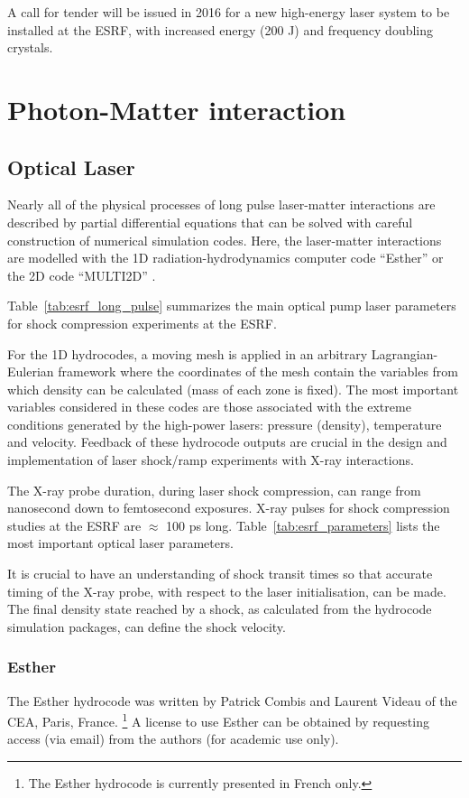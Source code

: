 \documentclass[12pt]{scrartcl}
\begin{document}
A call for tender will be issued in 2016 for a new high-energy laser system to be installed at the ESRF, with increased energy (200 J) and
frequency doubling crystals.

\section{Photon-Matter interaction}
\subsection{Optical Laser}
Nearly all of the physical processes of long pulse laser-matter interactions are described by partial differential
equations that can be solved with careful construction of numerical simulation codes. Here, the laser-matter
interactions are modelled with the 1D radiation-hydrodynamics computer code ``Esther'' \cite{Colombier2005}
or the 2D code ``MULTI2D'' \cite{Ramis2009}.

Table~\ref{tab:esrf_long_pulse} summarizes the main optical pump laser
parameters for shock compression experiments at the ESRF.

For the 1D hydrocodes, a moving mesh is applied in an arbitrary Lagrangian-Eulerian framework where the coordinates of
the mesh contain the variables from which density can be calculated (mass of
each zone is fixed). The most important variables
considered in these codes are those associated with the extreme conditions generated by the high-power lasers: pressure (density),
temperature and velocity. Feedback of these hydrocode outputs are crucial in the design and implementation of laser shock/ramp
experiments with X-ray interactions.

The X-ray probe duration, during laser shock compression, can range from nanosecond down to femtosecond exposures.
X-ray pulses for shock compression studies at the ESRF are $\approx$ 100 ps
long. Table~\ref{tab:esrf_parameters} lists the most important optical laser
parameters.

It is crucial to have an understanding of shock transit times so that accurate timing of the X-ray probe,
with respect to the laser initialisation, can be made. The final density state reached by a shock, as calculated
from the hydrocode simulation packages, can define the shock velocity.
\subsubsection{Esther}
The Esther hydrocode was written by Patrick Combis and Laurent Videau of the CEA, Paris, France.
\footnote{The Esther hydrocode is currently presented in French only.}
A license to use Esther can be obtained by requesting access (via email) from the authors (for academic use only).
\end{document}
